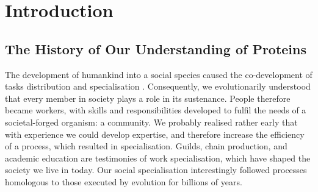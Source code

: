 \chapter{Introduction} \label{chapter:introduction}
\newpage
\mbox{}
\newpage
\section{The History of Our Understanding of Proteins}

The development of humankind into a social species caused the co-development of tasks distribution and specialisation \cite{masclans_sexual_2021, waguespack_organization_2005, fargher_comparison_2009}. Consequently, we evolutionarily understood that every member in society plays a role in its sustenance. People therefore became workers, with skills and responsibilities developed to fulfil the needs of a societal-forged organism: a community. We probably realised rather early that with experience we could develop expertise, and therefore increase the efficiency of a process, which resulted in specialisation. Guilds, chain production, and academic education are testimonies of work specialisation, which have shaped the society we live in today. Our social specialisation interestingly followed processes homologous to those executed by evolution for billions of years.

